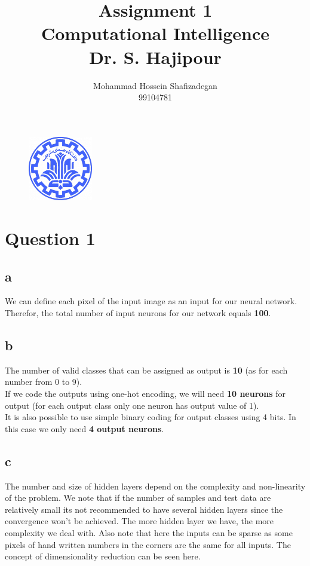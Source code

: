 \documentclass[]{article}
\author{
	Mohammad Hossein Shafizadegan\\
	99104781
}
\title{
	Assignment 1 \\
	Computational Intelligence  \\
	Dr. S. Hajipour
}
\begin{document}
	\begin{figure}
		\includegraphics[width=0.25\textwidth]{Fig/Sharif.png}
		\centering
	\end{figure}
	\maketitle
	\tableofcontents
	\newpage
	\section{Question 1}
	\subsection*{a}
	We can define each pixel of the input image as an input for our neural network. Therefor, the total number of input neurons for our network equals \textbf{100}.
	\subsection*{b}
	The number of valid classes that can be assigned as output is \textbf{10} (as for each number from 0 to 9).\\
	If we code the outputs using one-hot encoding, we will need \textbf{10 neurons} for output (for each output class only one neuron has output value of 1).\\
	It is also possible to use simple binary coding for output classes using 4 bits. In this case we only need \textbf{4 output neurons}.
	\subsection*{c}
	The number and size of hidden layers depend on the complexity and non-linearity of the problem. We note that if the number of samples and test data are relatively small its not recommended to have several hidden layers since the convergence won't be achieved. The more hidden layer we have, the more complexity we deal with. Also note that here the inputs can be sparse as some pixels of hand written numbers in the corners are the same for all inputs. The concept of dimensionality reduction can be seen here. 
	
\end{document}
